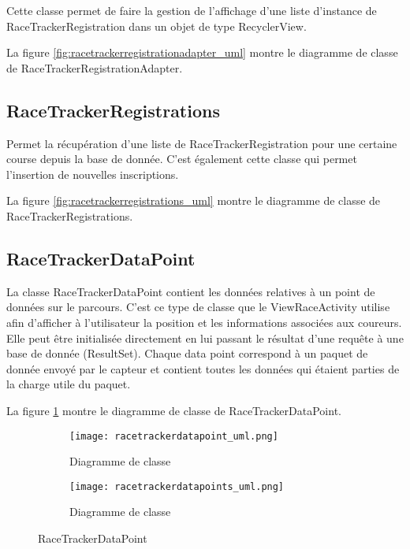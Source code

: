 Cette classe permet de faire la gestion de l'affichage d'une liste d'instance de RaceTrackerRegistration dans un objet de type RecyclerView.

La figure \ref{fig:racetrackerregistrationadapter_uml} montre le diagramme de classe de RaceTrackerRegistrationAdapter.

\subsection{RaceTrackerRegistrations}

Permet la récupération d'une liste de RaceTrackerRegistration pour une certaine course depuis la base de donnée. C'est également cette classe qui permet l'insertion de nouvelles inscriptions.

La figure \ref{fig:racetrackerregistrations_uml} montre le diagramme de classe de RaceTrackerRegistrations.

\subsection{RaceTrackerDataPoint}

La classe RaceTrackerDataPoint contient les données relatives à un point de données sur le parcours. C'est ce type de classe que le ViewRaceActivity utilise afin d'afficher à l'utilisateur la position et les informations associées aux coureurs. Elle peut être initialisée directement en lui passant le résultat d'une requête à une base de donnée (ResultSet). Chaque data point correspond à un paquet de donnée envoyé par le capteur et contient toutes les données qui étaient parties de la charge utile du paquet.

La figure \ref{fig:racetrackerdatapoint_uml} montre le diagramme de classe de RaceTrackerDataPoint.
 
 \begin{figure}[htb!]
    \centering
    \begin{subfigure}[htb]{1\textwidth}
		\texttt{[image: racetrackerdatapoint\_uml.png]} 
		\caption{Diagramme de classe}
		\label{fig:racetrackerdatapoint_uml}
    \end{subfigure}
    \begin{subfigure}[htb]{1\textwidth}
		\texttt{[image: racetrackerdatapoints\_uml.png]} 
		\caption{Diagramme de classe}
		\label{fig:racetrackerdatapoints_uml}
    \end{subfigure}
    \caption{RaceTrackerDataPoint}\label{fig:racetrackerdatapoints_fig}
\end{figure}

